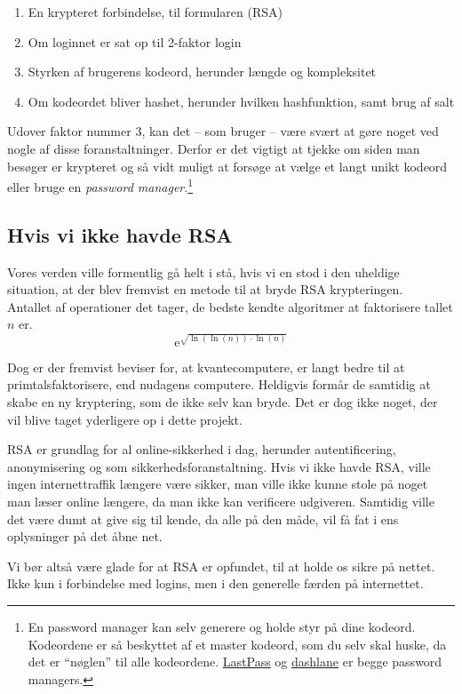 \begin{enumerate}[noitemsep]
    \item En krypteret forbindelse, til formularen (RSA)
    \item Om loginnet er sat op til 2-faktor login
    \item Styrken af brugerens kodeord, herunder længde og kompleksitet
    \item Om kodeordet bliver hashet, herunder hvilken hashfunktion, samt brug af salt
\end{enumerate}


Udover faktor nummer 3, kan det -- som bruger -- være svært at gøre noget ved nogle af disse foranstaltninger.
Derfor er det vigtigt at tjekke om siden man besøger er krypteret og så vidt muligt at forsøge at vælge et langt unikt kodeord eller bruge en \emph{password manager}.\footnote{En password manager kan selv generere og holde styr på dine kodeord. Kodeordene er så beskyttet af et master kodeord, som du selv skal huske, da det er ``nøglen'' til alle kodeordene. \href{https://www.lastpass.com/}{LastPass} og \href{https://www.dashlane.com/}{dashlane} er begge password managers.}

\subsection{Hvis vi ikke havde RSA}
Vores verden ville formentlig gå helt i stå, hvis vi en stod i den uheldige situation, at der blev fremvist en metode til at bryde RSA krypteringen.\\
Antallet af operationer det tager, de bedste kendte algoritmer at faktorisere tallet \(n\) er.\cite[119]{krypto}
\[\mathrm{e}^{\sqrt{\ln(\ln(n)) \cdot \ln(n)}}\]

Dog er der fremvist beviser for, at kvantecomputere, er langt bedre til at primtalsfaktorisere, end nudagens computere.\cite{quantum}
Heldigvis formår de samtidig at skabe en ny kryptering, som de ikke selv kan bryde.
Det er dog ikke noget, der vil blive taget yderligere op i dette projekt.

RSA er grundlag for al online-sikkerhed i dag, herunder autentificering, anonymisering og som sikkerhedsforanstaltning.
Hvis vi ikke havde RSA, ville ingen internettraffik længere være sikker, man ville ikke kunne stole på noget man læser online længere, da man ikke kan verificere udgiveren.
Samtidig ville det være dumt at give sig til kende, da alle på den måde, vil få fat i ens oplysninger på det åbne net.

Vi bør altså være glade for at RSA er opfundet, til at holde os sikre på nettet. Ikke kun i forbindelse med logins, men i den generelle færden på internettet.
